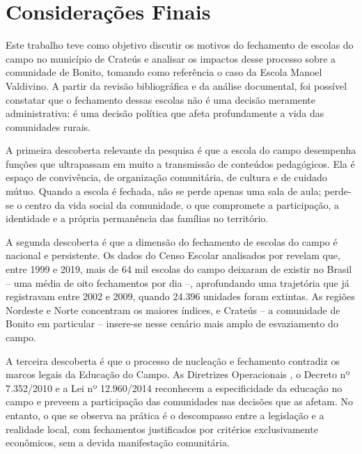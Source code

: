 \documentclass[
  12pt,
  openright,
  twoside,
  a4paper,
  english,
  brazilian,
  sumario=tradicional
]{abntex2}
\begin{document}
\section{Considerações Finais}
Este trabalho teve como objetivo discutir os motivos do fechamento de escolas do campo no município de Crateús e analisar os impactos desse processo sobre a comunidade de Bonito, tomando como referência o caso da Escola Manoel Valdivino. A partir da revisão bibliográfica e da análise documental, foi possível constatar que o fechamento dessas escolas não é uma decisão meramente administrativa: é uma decisão política que afeta profundamente a vida das comunidades rurais.

A primeira descoberta relevante da pesquisa é que a escola do campo desempenha funções que ultrapassam em muito a transmissão de conteúdos pedagógicos. Ela é espaço de convivência, de organização comunitária, de cultura e de cuidado mútuo. Quando a escola é fechada, não se perde apenas uma sala de aula; perde-se o centro da vida social da comunidade, o que compromete a participação, a identidade e a própria permanência das famílias no território.

A segunda descoberta é que a dimensão do fechamento de escolas do campo é nacional e persistente. Os dados do Censo Escolar analisados por  revelam que, entre 1999 e 2019, mais de 64 mil escolas do campo deixaram de existir no Brasil -- uma média de oito fechamentos por dia --, aprofundando uma trajetória que  já registravam entre 2002 e 2009, quando 24.396 unidades foram extintas. As regiões Nordeste e Norte concentram os maiores índices, e Crateús -- a comunidade de Bonito em particular -- insere-se nesse cenário mais amplo de esvaziamento do campo.

A terceira descoberta é que o processo de nucleação e fechamento contradiz os marcos legais da Educação do Campo. As Diretrizes Operacionais \cite{brasil2002}, o Decreto nº 7.352/2010 \cite{brasil2010} e a Lei nº 12.960/2014 \cite{brasil2014} reconhecem a especificidade da educação no campo e preveem a participação das comunidades nas decisões que as afetam. No entanto, o que se observa na prática é o descompasso entre a legislação e a realidade local, com fechamentos justificados por critérios exclusivamente econômicos, sem a devida manifestação comunitária.
\end{document}

